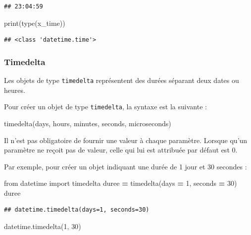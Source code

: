 \documentclass[
  12pt,
]{book}
\newenvironment{Shaded}{\begin{snugshade}}{\end{snugshade}}
\newcommand{\BuiltInTok}[1]{#1}
\newcommand{\DecValTok}[1]{\textcolor[rgb]{0.00,0.00,0.81}{#1}}
\newcommand{\ImportTok}[1]{#1}
\newcommand{\NormalTok}[1]{#1}
\newcommand{\OperatorTok}[1]{\textcolor[rgb]{0.81,0.36,0.00}{\textbf{#1}}}
\numberwithin{equation}{section}
\numberwithin{countremarque}{section}
\begin{document}
\begin{lstlisting}
## 23:04:59
\end{lstlisting}

\begin{Shaded}
\begin{Highlighting}[]
\BuiltInTok{print}\NormalTok{(}\BuiltInTok{type}\NormalTok{(x\_time))}
\end{Highlighting}
\end{Shaded}

\begin{lstlisting}
## <class 'datetime.time'>
\end{lstlisting}

\subsubsection{Timedelta}\label{timedelta}

Les objets de type \texttt{timedelta} représentent des durées séparant deux dates ou heures.

Pour créer un objet de type \texttt{timedelta}, la syntaxe est la suivante :

\begin{Shaded}
\begin{Highlighting}[]
\NormalTok{timedelta(days, hours, minutes, seconds, microseconds)}
\end{Highlighting}
\end{Shaded}

Il n'est pas obligatoire de fournir une valeur à chaque paramètre. Lorsque qu'un paramètre ne reçoit pas de valeur, celle qui lui est attribuée par défaut est 0.

Par exemple, pour créer un objet indiquant une durée de 1 jour et 30 secondes :

\begin{Shaded}
\begin{Highlighting}[]
\ImportTok{from}\NormalTok{ datetime }\ImportTok{import}\NormalTok{ timedelta}
\NormalTok{duree }\OperatorTok{=}\NormalTok{ timedelta(days }\OperatorTok{=} \DecValTok{1}\NormalTok{, seconds }\OperatorTok{=} \DecValTok{30}\NormalTok{)}
\NormalTok{duree}
\end{Highlighting}
\end{Shaded}

\begin{lstlisting}
## datetime.timedelta(days=1, seconds=30)
\end{lstlisting}

\begin{Shaded}
\begin{Highlighting}[]
\NormalTok{datetime.timedelta(}\DecValTok{1}\NormalTok{, }\DecValTok{30}\NormalTok{)}
\end{Highlighting}
\end{Shaded}
\end{document}
